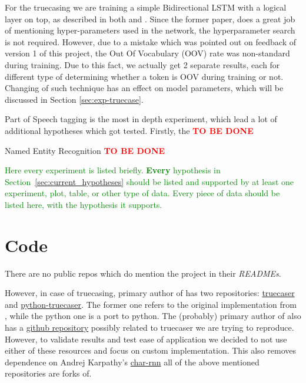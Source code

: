 \documentclass[11pt,a4paper]{article}
\begin{document}
For the truecasing we are training a simple Bidirectional LSTM with a logical layer on top, as described in both \cite{ner-and-pos-original} and \cite{susanto-etal-2016-learning}. Since the former paper, does a great job of mentioning hyper-parameters used in the network, the hyperparameter search is not required. However, due to a mistake which was pointed out on feedback of version 1 of this project, the Out Of Vocabulary (OOV) rate was non-standard during training. Due to this fact, we actually get 2 separate results, each for different type of determining whether a token is OOV during training or not. Changing of such technique has an effect on model parameters, which will be discussed in Section \ref{sec:exp-truecase}.

Part of Speech tagging is the most in depth experiment, which lead a lot of additional hypotheses which got tested. Firstly, the \textbf{\textcolor{red}{TO BE DONE}}

Named Entity Recognition \textbf{\textcolor{red}{TO BE DONE}}

\textcolor{green}{
Here every experiment is listed briefly.
\textbf{Every} hypothesis in Section~\ref{sec:current_hypotheses} should be listed and supported by at least one experiment, plot, table, or other type of data. 
Every piece of data should be listed here, with the hypothesis it supports.
}

\section{Code}
There are no public repos which do mention the project in their \textit{READMEs}.

However, in case of truecasing, primary author of \cite{ner-and-pos-original} has two repositories: \href{https://github.com/mayhewsw/truecaser}{truecaser} and \href{https://github.com/mayhewsw/pytorch-truecaser}{python-truecaser}. The former one refers to the original implementation from \cite{susanto-etal-2016-learning}, while the python one is a port to python. The (probably) primary author of \cite{susanto-etal-2016-learning} also has a \href{https://github.com/raymondhs/char-rnn-truecase}{github repository} possibly related to truecaser we are trying to reproduce. However, to validate results and test ease of application we decided to not use either of these resources and focus on custom implementation. This also removes dependence on Andrej Karpathy's \href{https://github.com/karpathy/char-rnn}{char-rnn} all of the above mentioned repositories are forks of.
\end{document}
